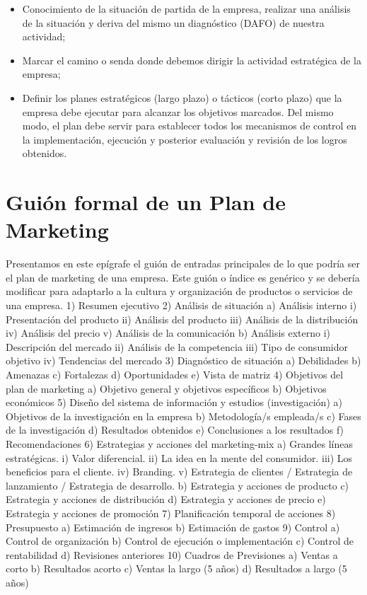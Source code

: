 \documentclass[
]{book}
\providecommand{\tightlist}{%
  \setlength{\itemsep}{0pt}\setlength{\parskip}{0pt}}
\begin{document}
\begin{itemize}
\tightlist
\item
  Conocimiento de la situación de partida de la empresa, realizar una análisis de la situación y deriva del mismo un diagnóstico (DAFO) de nuestra actividad;
\item
  Marcar el camino o senda donde debemos dirigir la actividad estratégica de la empresa;\\
\item
  Definir los planes estratégicos (largo plazo) o tácticos (corto plazo) que la empresa debe ejecutar para alcanzar los objetivos marcados. Del mismo modo, el plan debe servir para establecer todos los mecanismos de control en la implementación, ejecución y posterior evaluación y revisión de los logros obtenidos.
\end{itemize}

\hypertarget{guiuxf3n-formal-de-un-plan-de-marketing}{%
\section{Guión formal de un Plan de Marketing}\label{guiuxf3n-formal-de-un-plan-de-marketing}}

Presentamos en este epígrafe el guión de entradas principales de lo que podría ser el plan de marketing de una empresa. Este guión o índice es genérico y se debería modificar para adaptarlo a la cultura y organización de productos o servicios de una empresa.
1) Resumen ejecutivo
2) Análisis de situación
a) Análisis interno
i) Presentación del producto
ii) Análisis del producto
iii) Análisis de la distribución
iv) Análisis del precio
v) Análisis de la comunicación
b) Análisis externo
i) Descripción del mercado
ii) Análisis de la competencia
iii) Tipo de consumidor objetivo
iv) Tendencias del mercado
3) Diagnóstico de situación
a) Debilidades
b) Amenazas
c) Fortalezas
d) Oportunidades
e) Vista de matriz
4) Objetivos del plan de marketing
a) Objetivo general y objetivos específicos
b) Objetivos económicos
5) Diseño del sistema de información y estudios (investigación)
a) Objetivos de la investigación en la empresa
b) Metodología/s empleada/s
c) Fases de la investigación
d) Resultados obtenidos
e) Conclusiones a los resultados
f) Recomendaciones
6) Estrategias y acciones del marketing-mix
a) Grandes líneas estratégicas.
i) Valor diferencial.
ii) La idea en la mente del consumidor.
iii) Los beneficios para el cliente.
iv) Branding.
v) Estrategia de clientes / Estrategia de lanzamiento / Estrategia de desarrollo.
b) Estrategia y acciones de producto
c) Estrategia y acciones de distribución
d) Estrategia y acciones de precio
e) Estrategia y acciones de promoción
7) Planificación temporal de acciones
8) Presupuesto
a) Estimación de ingresos
b) Estimación de gastos
9) Control
a) Control de organización
b) Control de ejecución o implementación
c) Control de rentabilidad
d) Revisiones anteriores
10) Cuadros de Previsiones
a) Ventas a corto
b) Resultados acorto
c) Ventas la largo (5 años)
d) Resultados a largo (5 años)
\end{document}
